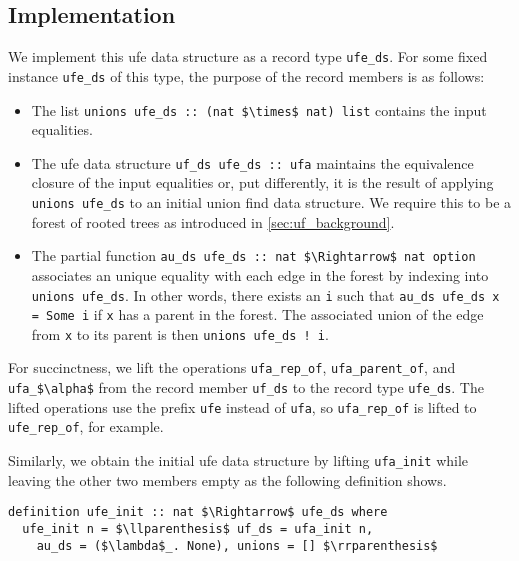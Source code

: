 \documentclass[
  sigplan,
  10pt,
  anonymous,
  review,
  ]{acmart}
\begin{document}
\subsection{Implementation}
We implement this \acrshort{ufe} data structure as a record type \lstinline|ufe_ds|.
For some fixed instance \lstinline|ufe_ds| of this type, the purpose of the record members is as follows:
\begin{itemize}
  \item The list \lstinline|unions ufe_ds :: (nat $\times$ nat) list| contains the input equalities.
  \item The \acrshort{ufe} data structure \lstinline|uf_ds ufe_ds :: ufa| maintains the equivalence closure of the input equalities or, put differently, it is the result of applying \lstinline|unions ufe_ds| to an initial union find data structure.
    We require this to be a forest of rooted trees as introduced in \autoref{sec:uf_background}.
  \item The partial function \lstinline|au_ds ufe_ds :: nat $\Rightarrow$ nat option| associates an unique equality with each edge in the forest by indexing into \lstinline|unions ufe_ds|.
    In other words, there exists an \lstinline|i| such that \lstinline|au_ds ufe_ds x = Some i| if \lstinline|x| has a parent in the forest.
    The associated union of the edge from \lstinline|x| to its parent is then \lstinline|unions ufe_ds ! i|.
\end{itemize}
For succinctness, we lift the operations \lstinline|ufa_rep_of|, \lstinline|ufa_parent_of|, and \lstinline|ufa_$\alpha$| from the record member \lstinline|uf_ds| to the record type \lstinline|ufe_ds|.
The lifted operations use the prefix \lstinline|ufe| instead of \lstinline|ufa|, so \lstinline|ufa_rep_of| is lifted to \lstinline|ufe_rep_of|, for example.

Similarly, we obtain the initial \acrshort{ufe} data structure by lifting \lstinline|ufa_init| while leaving the other two members empty as the following definition shows.
\begin{lstlisting}
definition ufe_init :: nat $\Rightarrow$ ufe_ds where
  ufe_init n = $\llparenthesis$ uf_ds = ufa_init n,
    au_ds = ($\lambda$_. None), unions = [] $\rrparenthesis$
\end{lstlisting}
\end{document}
